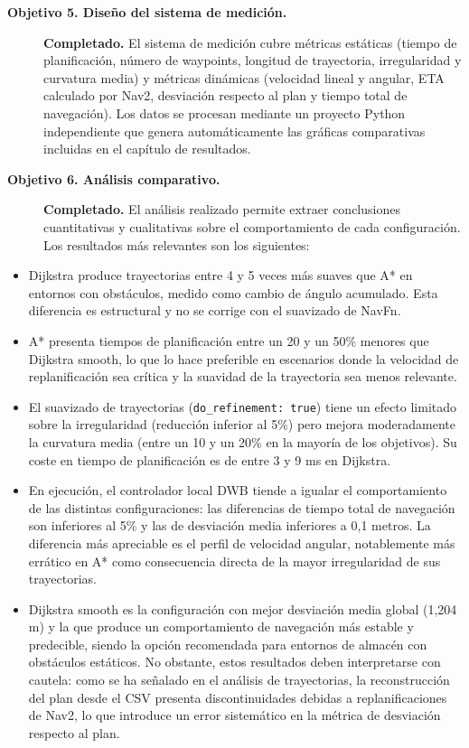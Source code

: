 \begin{description}
    \item[\textbf{Objetivo 5. Diseño del sistema de medición.}] \hfill\break
    \textbf{Completado.} El sistema de medición cubre métricas estáticas (tiempo de planificación, número de waypoints, longitud de trayectoria, irregularidad y curvatura media) y métricas dinámicas (velocidad lineal y angular, ETA calculado por Nav2, desviación respecto al plan y tiempo total de navegación). Los datos se procesan mediante un proyecto Python independiente que genera automáticamente las gráficas comparativas incluidas en el capítulo de resultados.

    \item[\textbf{Objetivo 6. Análisis comparativo.}] \hfill\break
    \textbf{Completado.} El análisis realizado permite extraer conclusiones cuantitativas y cualitativas sobre el comportamiento de cada configuración. Los resultados más relevantes son los siguientes:

\end{description}

\begin{itemize}
    \item Dijkstra produce trayectorias entre 4 y 5 veces más suaves que A* en entornos con obstáculos, medido como cambio de ángulo acumulado. Esta diferencia es estructural y no se corrige con el suavizado de NavFn.

    \item A* presenta tiempos de planificación entre un 20 y un 50\% menores que Dijkstra smooth, lo que lo hace preferible en escenarios donde la velocidad de replanificación sea crítica y la suavidad de la trayectoria sea menos relevante.

    \item El suavizado de trayectorias (\texttt{do\_refinement: true}) tiene un efecto limitado sobre la irregularidad (reducción inferior al 5\%) pero mejora moderadamente la curvatura media (entre un 10 y un 20\% en la mayoría de los objetivos). Su coste en tiempo de planificación es de entre 3 y 9 ms en Dijkstra.

    \item En ejecución, el controlador local DWB tiende a igualar el comportamiento de las distintas configuraciones: las diferencias de tiempo total de navegación son inferiores al 5\% y las de desviación media inferiores a 0,1 metros. La diferencia más apreciable es el perfil de velocidad angular, notablemente más errático en A* como consecuencia directa de la mayor irregularidad de sus trayectorias.

    \item Dijkstra smooth es la configuración con mejor desviación media global (1,204 m) y la que produce un comportamiento de navegación más estable y predecible, siendo la opción recomendada para entornos de almacén con obstáculos estáticos. No obstante, estos resultados deben interpretarse con cautela: como se ha señalado en el análisis de trayectorias, la reconstrucción del plan desde el CSV presenta discontinuidades debidas a replanificaciones de Nav2, lo que introduce un error sistemático en la métrica de desviación respecto al plan.
\end{itemize}

